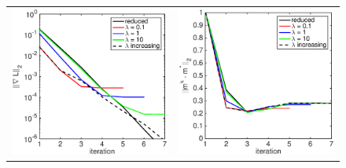 \documentclass{iopart}
\begin{document}
\begin{figure}
\centering
\begin{tabular}{cc}
\includegraphics[scale=.3]{./figs/2D_exp1_b}&
\includegraphics[scale=.3]{./figs/2D_exp1_c}\\
\end{tabular}

\end{figure}
\end{document}
